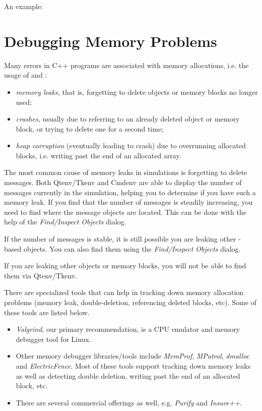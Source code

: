 An example: 





\section{Debugging Memory Problems}
\label{sec:run-sim:memory-leaks-and-crashes}

Many errors in C++ programs are associated with memory allocations, i.e. the
usage of  and :

\begin{itemize}
   \item \textit{memory leaks,} that is, forgetting to delete objects
     or memory blocks no longer used;
   \item \textit{crashes,} usually due to referring to an already deleted
     object or memory block, or trying to delete one for a second time;
   \item \textit{heap corruption} (eventually leading to crash) due to
     overrunning allocated blocks, i.e. writing past the end of an allocated
     array.
\end{itemize}

The most common cause of memory leaks in {\opp} simulations is
forgetting to delete messages. Both Qtenv/Tkenv and Cmdenv are able
to display the number of messages currently in the simulation,
helping you to determine if you have such a memory leak.
If you find that the number of messages is steadily increasing,
you need to find where the message objects are located. This can be done with
the help of the \textit{Find/Inspect Objects} dialog.

If the number of messages is stable, it is still possible
you are leaking other -based objects. You can also
find them using the \textit{Find/Inspect Objects} dialog.

If you are leaking other objects or memory blocks, you will not be able to find
them via Qtenv/Tkenv.

There are specialized tools that can help in tracking down memory allocation
problems (memory leak, double-deletion, referencing deleted blocks, etc). Some
of these tools are listed below.

\begin{itemize}
  \item \textit{Valgrind}, our primary recommendation, is a CPU emulator and
        memory debugger tool for Linux.
  \item Other memory debugger libraries/tools include \textit{MemProf},
        \textit{MPatrol}, \textit{dmalloc} and \textit{ElectricFence}.
        Most of these tools support tracking down memory leaks as well as
        detecting double deletion, writing past the end of an allocated block,
        etc.
  \item There are several commercial offerings as well, e.g. \textit{Purify}
        and \textit{Insure++}.
\end{itemize}


